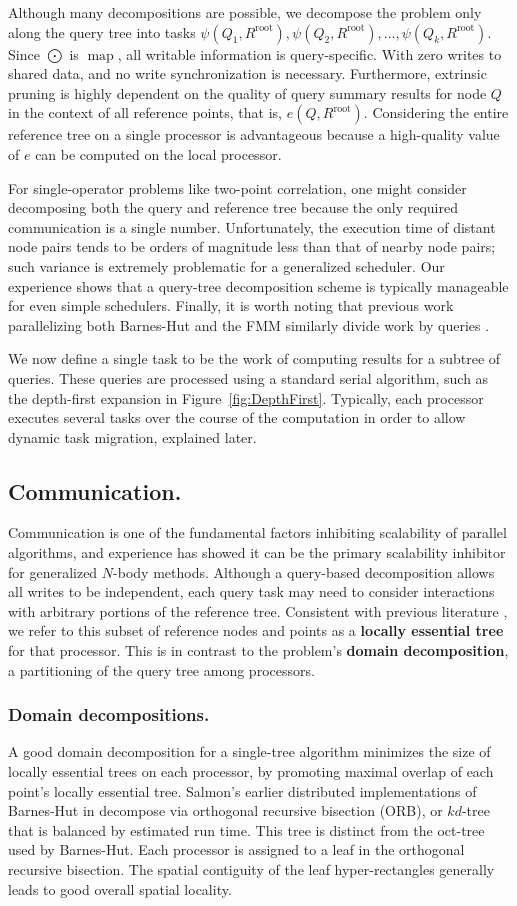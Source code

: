 \documentclass[twoside,leqno,twocolumn]{article}
\DeclareMathOperator*{\map}{map}
\newcommand{\fig}[1]{Figure~\ref{fig:#1}}
\newcommand{\gnp}{\psi}
\newcommand{\mysubsub}[1]{\subsubsection{#1.}}
\newcommand{\mysub}[1]{\subsection{#1.}}
\newcommand{\defterm}[1]{{\bf #1}}
\newcommand{\kdroot}[1]{#1^{\text{root}}}
\newcommand{\lettermu}{e}
\newcommand{\inmu}{e}
\begin{document}
Although many decompositions are possible, we decompose the problem only along the query tree into tasks $\gnp(Q_1, \kdroot{R}), \gnp(Q_2, \kdroot{R}), ..., \gnp(Q_k, \kdroot{R})$.
Since $\bigodot$ is $\map$, all writable information is query-specific.
With zero writes to shared data, and no write synchronization is necessary.
Furthermore, extrinsic pruning is highly dependent on the quality of query summary results for node $Q$ in the context of all reference points, that is, $\inmu(Q, \kdroot{R})$.
Considering the entire reference tree on a single processor is advantageous because a high-quality value of $\lettermu$ can be computed on the local processor.

For single-operator problems like two-point correlation, one might consider decomposing both the query and reference tree because the only required communication is a single number.
Unfortunately, the execution time of distant node pairs tends to be orders of magnitude less than that of nearby node pairs; such variance is extremely problematic for a generalized scheduler.
Our experience shows that a query-tree decomposition scheme is typically manageable for even simple schedulers.
Finally, it is worth noting that previous work parallelizing both Barnes-Hut and the FMM similarly divide work by queries \cite{liu94experiences, salmon_thesis, singh_thesis}.

We now define a single task to be the work of computing results for a subtree of queries.
These queries are processed using a standard serial algorithm, such as the depth-first expansion in \fig{DepthFirst}.
Typically, each processor executes several tasks over the course of the computation in order to allow dynamic task migration, explained later.

\mysub{Communication}

Communication is one of the fundamental factors inhibiting scalability of parallel algorithms, and experience has showed it can be the primary scalability inhibitor for generalized $N$-body methods.
Although a query-based decomposition allows all writes to be independent, each query task may need to consider interactions with arbitrary portions of the reference tree.
Consistent with previous literature \cite{salmon_thesis, singh_thesis}, we refer to this subset of reference nodes and points as a \defterm{locally essential tree} for that processor.
This is in contrast to the problem's \defterm{domain decomposition}, a partitioning of the query tree among processors.

\mysubsub{Domain decompositions}
A good domain decomposition for a single-tree algorithm minimizes the size of locally essential trees on each processor, by promoting maximal overlap of each point's locally essential tree.
Salmon's earlier distributed implementations of Barnes-Hut in \cite{salmon_thesis} decompose via orthogonal recursive bisection (ORB), or $kd$-tree that is balanced by estimated run time.
This tree is distinct from the oct-tree used by Barnes-Hut.
Each processor is assigned to a leaf in the orthogonal recursive bisection.
The spatial contiguity of the leaf hyper-rectangles generally leads to good overall spatial locality.
\end{document}

